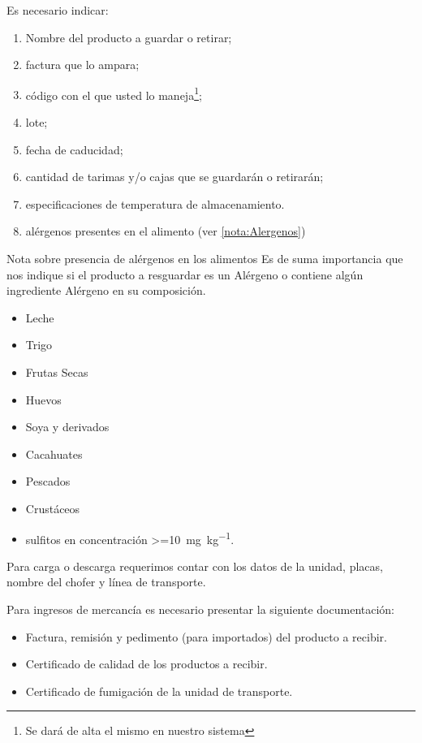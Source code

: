 Es necesario indicar:
\begin{enumerate}
	\item Nombre del producto a guardar o retirar;
	\item factura que lo ampara;
	\item código con el que usted lo maneja\footnote{Se dará de alta el mismo en nuestro sistema};
	\item lote;
	\item fecha de caducidad;
	\item cantidad de tarimas y/o cajas que se guardarán o retirarán;
	\item especificaciones de temperatura de almacenamiento.
	\item alérgenos presentes en el \gls{alimento} (ver \ref{nota:Alergenos})
\end{enumerate}

\begin{nota}{Nota sobre presencia de alérgenos en los \glspl{alimento}}
\label{nota:Alergenos}
Es de suma importancia que nos indique si el producto a resguardar es un Alérgeno o contiene algún ingrediente Alérgeno en su composición.

\begin{itemize}
	\item Leche
	\item Trigo
	\item Frutas Secas
	\item Huevos
	\item Soya y derivados
	\item Cacahuates
	\item Pescados
	\item Crustáceos
	\item sulfitos en concentración \qty{>=10}{\milli\gram\per\kilo\gram}.
\end{itemize}

\end{nota}

Para carga o descarga requerimos contar con los datos de la unidad, placas, nombre del chofer y línea de transporte.

Para ingresos de mercancía es necesario presentar la siguiente documentación:

\begin{itemize}
	\item Factura, remisión y pedimento (para importados) del producto a recibir.
	\item Certificado de calidad de los productos a recibir.
	\item Certificado de fumigación de la unidad de transporte.
\end{itemize}

